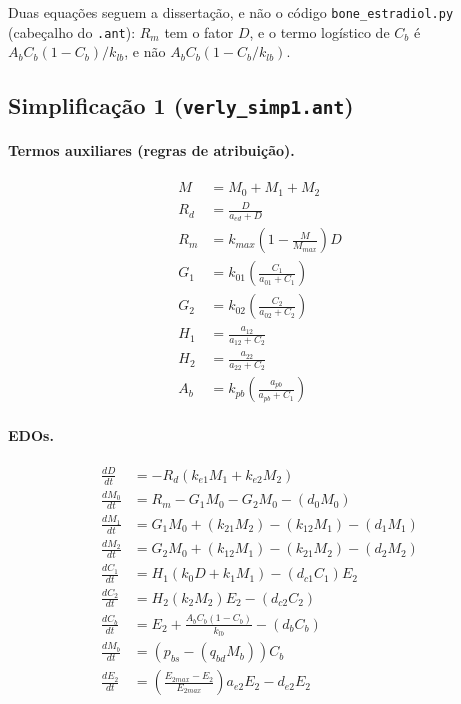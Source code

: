 \documentclass[11pt]{article}
\begin{document}
Duas equações seguem a dissertação, e não o código \texttt{bone\_estradiol.py} (cabeçalho do
\texttt{.ant}): $R_m$ tem o fator $D$, e o termo logístico de $C_b$ é
$A_b C_b (1 - C_b)/k_{lb}$, e não $A_b C_b (1 - C_b/k_{lb})$.

\subsection{Simplificação 1 (\texttt{verly\_simp1.ant})}

\paragraph{Termos auxiliares (regras de atribuição).}
\begin{align}
M   &= M_0 + M_1 + M_2 \\
R_d &= \frac{D}{a_{ed} + D} \\
R_m &= k_{max} \left(1 - \frac{M}{M_{max}}\right) D \\
G_1 &= k_{01} \left(\frac{C_1}{a_{01} + C_1}\right) \\
G_2 &= k_{02} \left(\frac{C_2}{a_{02} + C_2}\right) \\
H_1 &= \frac{a_{12}}{a_{12} + C_2} \\
H_2 &= \frac{a_{22}}{a_{22} + C_2} \\
A_b &= k_{pb} \left(\frac{a_{pb}}{a_{pb} + C_1}\right)
\end{align}

\paragraph{EDOs.}
\begin{align}
\frac{dD}{dt}   &= -R_d (k_{e1} M_1 + k_{e2} M_2) \\
\frac{dM_0}{dt} &= R_m - G_1 M_0 - G_2 M_0 - (d_0 M_0) \\
\frac{dM_1}{dt} &= G_1 M_0 + (k_{21} M_2) - (k_{12} M_1) - (d_1 M_1) \\
\frac{dM_2}{dt} &= G_2 M_0 + (k_{12} M_1) - (k_{21} M_2) - (d_2 M_2) \\
\frac{dC_1}{dt} &= H_1 (k_0 D + k_1 M_1) - (d_{c1} C_1) E_2 \\
\frac{dC_2}{dt} &= H_2 (k_2 M_2) E_2 - (d_{c2} C_2) \\
\frac{dC_b}{dt} &= E_2 + \frac{A_b C_b (1 - C_b)}{k_{lb}} - (d_b C_b) \\
\frac{dM_b}{dt} &= (p_{bs} - (q_{bd} M_b)) C_b \\
\frac{dE_2}{dt} &= \left(\frac{E_{2max} - E_2}{E_{2max}}\right) a_{e2} E_2 - d_{e2} E_2
\end{align}
\end{document}
